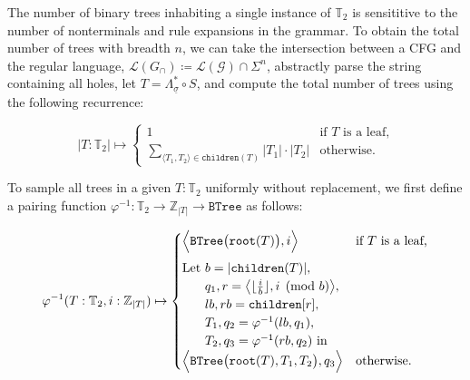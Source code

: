 \documentclass[runningheads]{llncs}
\begin{document}
The number of binary trees inhabiting a single instance of $\mathbb{T}_2$ is sensititive to the number of nonterminals and rule expansions in the grammar. To obtain the total number of trees with breadth $n$, we can take the intersection between a CFG and the regular language, $\mathcal{L}(G_\cap) \coloneqq \mathcal{L}(\mathcal{G}) \cap \Sigma^n$, abstractly parse the string containing all holes, let $T=\Lambda_{\underline\sigma}^* \circ S$, and compute the total number of trees using the following recurrence:



\begin{equation}
  |T: \mathbb{T}_2| \mapsto \begin{cases}
    1  & \text{if $T$ is a leaf,} \\
    \sum_{\langle T_1, T_2\rangle \in \texttt{children}(T)} |T_1| \cdot |T_2| & \text{otherwise.}
  \end{cases}
\end{equation}

To sample all trees in a given $T: \mathbb{T}_2$ uniformly without replacement, we first define a pairing function $\varphi^{-1}: \mathbb{T}_2 \rightarrow \mathbb{Z}_{|T|} \rightarrow \texttt{BTree}$ as follows:


\begin{equation}
  \varphi^{-1}(T: \mathbb{T}_2, i: \mathbb{Z}_{|T|}) \mapsto \begin{cases}
  \Big\langle\texttt{BTree}\big(\texttt{root}(T)\big), i\Big\rangle & \text{if $T$ is a leaf,} \vspace{5pt}\\
  \text{Let } b = |\texttt{children}(T)|,\\
  \phantom{\text{Let }} q_1, r=\big\langle\lfloor\frac{i}{b}\rfloor, i \pmod{b}\big\rangle,\\
  \phantom{\text{Let }} lb, rb = \texttt{children}[r],\\
  \phantom{\text{Let }} T_1, q_2 = \varphi^{-1}(lb, q_1),\\
  \phantom{\text{Let }} T_2, q_3 = \varphi^{-1}(rb, q_2) \text{ in } \\
  \Big\langle\texttt{BTree}\big(\texttt{root}(T), T_1, T_2\big), q_3\Big\rangle & \text{otherwise.} \\
  \end{cases}
\end{equation}
\end{document}
